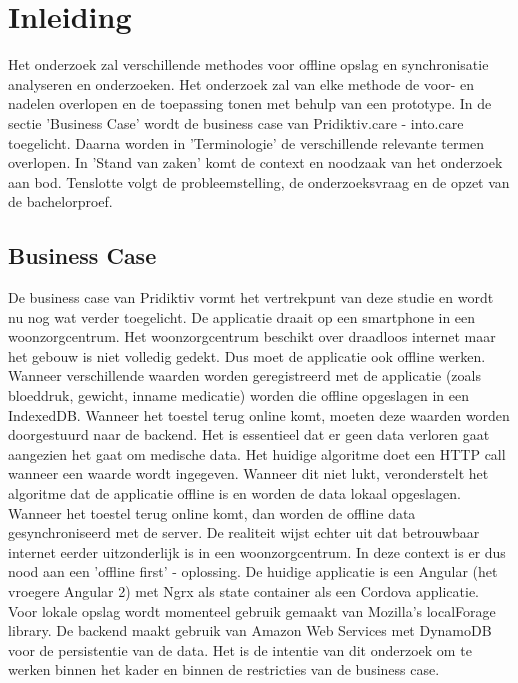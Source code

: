 \chapter{Inleiding}
\label{ch:inleiding}
Het onderzoek zal verschillende methodes voor offline opslag en synchronisatie analyseren en onderzoeken. Het onderzoek zal van elke methode de voor- en nadelen overlopen en de toepassing tonen met behulp van een prototype. In de sectie 'Business Case' wordt de business case van Pridiktiv.care - into.care toegelicht. Daarna worden in 'Terminologie' de verschillende relevante termen overlopen. In 'Stand van zaken' komt de context en noodzaak van het onderzoek aan bod. Tenslotte volgt de probleemstelling, de onderzoeksvraag en de opzet van de bachelorproef.
\section{Business Case}
\label{sec:business-case}
De business case van Pridiktiv vormt het vertrekpunt van deze studie en wordt nu nog wat verder toegelicht. De applicatie draait op een smartphone in een woonzorgcentrum. Het woonzorgcentrum beschikt over draadloos internet maar het gebouw is niet volledig gedekt. Dus moet de applicatie ook offline werken. Wanneer verschillende waarden worden geregistreerd met de applicatie (zoals bloeddruk, gewicht, inname medicatie) worden die offline opgeslagen in een IndexedDB. Wanneer het toestel terug online komt, moeten deze waarden worden doorgestuurd naar de backend. Het is essentieel dat er geen data verloren gaat aangezien het gaat om medische data. Het huidige algoritme doet een HTTP call wanneer een waarde wordt ingegeven. Wanneer dit niet lukt, veronderstelt het algoritme dat de applicatie offline is en worden de data lokaal opgeslagen. Wanneer het toestel terug online komt, dan worden de offline data gesynchroniseerd met de server. De realiteit wijst echter uit dat betrouwbaar internet eerder uitzonderlijk is in een woonzorgcentrum. In deze context is er dus nood aan een 'offline first' -  oplossing. De huidige applicatie is een Angular (het vroegere Angular 2) met Ngrx als state container als een Cordova applicatie. Voor lokale opslag wordt momenteel gebruik gemaakt van Mozilla's localForage library. De backend maakt gebruik van Amazon Web Services met DynamoDB voor de persistentie van de data. Het is de intentie van dit onderzoek om te werken binnen het kader en binnen de restricties van de business case.
